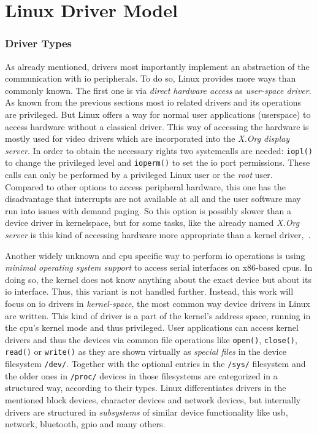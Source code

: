   
\section{Linux Driver Model}
\subsubsection*{Driver Types}
As already mentioned, drivers most importantly implement an abstraction of the communication with \ac{io} peripherals.
To do so, Linux provides more ways than commonly known.
The first one is via \textit{direct hardware access} as \textit{user-space driver}.
As known from the previous sections most \ac{io} related drivers and its operations are privileged.
But Linux offers a way for normal user applications (userspace) to access hardware without a classical driver.
This way of accessing the hardware is mostly used for video drivers which are incorporated into the \textit{X.Org display server}.
In order to obtain the necessary rights two systemcalls are needed: \texttt{iopl()} to change the privileged level and \texttt{ioperm()} to set the \ac{io} port permissions.
These calls can only be performed by a privileged Linux user or the \textit{root} user.
Compared to other options to access peripheral hardware, this one has the disadvantage that interrupts are not available at all and the user software may run into issues with demand paging.
So this option is possibly slower than a device driver in kernelspace, but for some tasks, like the already named \textit{X.Org server} is this kind of accessing hardware more appropriate than a kernel driver\cite{lfd430},~\cite{glatz2015betriebssysteme}.

Another widely unknown and \ac{cpu} specific way to perform \ac{io} operations is using \textit{minimal operating system support} to access serial interfaces on x86-based \acp{cpu}.
In doing so, the kernel does not know anything about the exact device but about its \ac{io} interface\cite{glatz2015betriebssysteme}.
Thus, this variant is not handled further.
Instead, this work will focus on \ac{io} drivers in \textit{kernel-space}, the most common way device drivers in Linux are written.
This kind of driver is a part of the kernel's address space, running in the \ac{cpu}'s kernel mode and thus privileged.
User applications can access kernel drivers and thus the devices via common file operations like \texttt{open()}, \texttt{close()}, \texttt{read()} or \texttt{write()} as they are shown virtually as \textit{special files} in the device filesystem \texttt{/dev/}.
Together with the optional entries in the \texttt{/sys/} filesystem and the older ones in \texttt{/proc/} devices in those filesystems are categorized in a structured way, according to their types\cite{glatz2015betriebssysteme}.
Linux differentiates drivers in the mentioned block devices, character devices and network devices, but internally drivers are structured in \textit{subsystems} of similar device functionality like usb, network, bluetooth, gpio and many others\cite{quade2016Linux}. 

